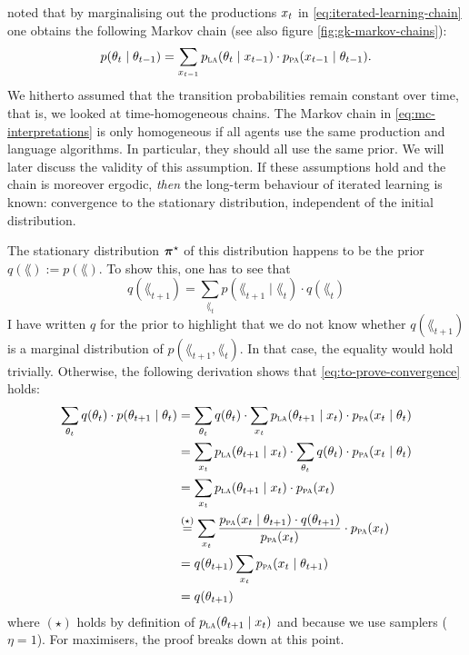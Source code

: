 \documentclass{../src/bcthesispart}
\begin{document}
\textcite{Griffiths2005} noted that by marginalising out the productions $x_t$ in \eqref{eq:iterated-learning-chain} one obtains the following Markov chain (see also figure \ref{fig:gk-markov-chains}):
\begin{align}
	p(\theta_t \mid \theta_{t-1}) 
		= \sum_{x_{t-1}} 
			p_{\textsc{la}}(\theta_t \mid x_{t-1}) 
			\cdot p_{\textsc{pa}}(x_{t-1} \mid \theta_{t-1}).
	\label{eq:mc-interpretations}
\end{align}
We hitherto assumed that the transition probabilities remain constant over time, that is, we looked at time-homogeneous chains. 
The Markov chain in \eqref{eq:mc-interpretations} is only homogeneous if all agents use the same production and language algorithms. 
In particular, they should all use the same prior.
We will later discuss the validity of this assumption. 
If these assumptions hold and the chain is moreover ergodic, \emph{then} the long-term behaviour of iterated learning is known: convergence to the stationary distribution, independent of the initial distribution.





The stationary distribution $\boldsymbol{\mathbf{\pi}}^\star$ of this distribution happens to be the prior $q(\lang) := p(\lang)$.
To show this, one has to see that
\begin{equation}
	\label{eq:to-prove-convergence}
	q( \lang_{t+1}) 
		= \sum_{\lang_t} 
			p(\lang_{t+1} \mid \lang_t) 
			\cdot q(\lang_t)
\end{equation}
I have written $q$ for the prior to highlight that we do not know whether $q(\lang_{t+1})$ is a marginal distribution of $p(\lang_{t+1}, \lang_t)$.
In that case, the equality would hold trivially.
Otherwise, the following derivation shows that \eqref{eq:to-prove-convergence} holds:
\begin{align}
	\label{eq:proof-conv-to-the-prior}
	\sum_{\lang_t} 
		q(\lang_t) 
		\cdot p(\lang_{t+1} \mid \lang_t)
		&= \sum_{\lang_t} 
				q(\lang_t) \cdot \sum_{\obs_t} 
					p_{\LA}(\lang_{t+1} \mid \obs_t)  
					\cdot p_{\PA}(\obs_t \mid \lang_t)
		\\
		&= \sum_{\obs_t} 
				p_{\LA}(\lang_{t+1} \mid \obs_t) 
				\cdot \sum_{\lang_t} 
		   			q(\lang_t) 
		   			\cdot p_{\PA}(\obs_t \mid \lang_t)
		\\\nonumber
		&= \sum_{\obs_t} 
			p_{\LA}(\lang_{t+1} \mid \obs_t) 
			\cdot p_{\PA}(\obs_t)
		\\\nonumber
		&\overset{(\star)}{=} 
			\sum_{\obs_t} 
				\frac{p_{\PA}(\obs_t \mid \lang_{t+1}) \cdot q(\lang_{t+1})}%
				{p_{\PA}(\obs_t)} \cdot p_{\PA}(\obs_t)
		\\\nonumber
		&= q(\lang_{t+1}) 
			\sum_{\obs_t} 
				p_{\PA}(\obs_t \mid \lang_{t+1})
		\\\nonumber
		&= q(\lang_{t+1}) 
\end{align}
where $(\star)$ holds by definition of $p_{\textsc{la}}(\theta_{t+1} \mid x_t)$ and because we use samplers ($\eta=1$).
For maximisers, the proof breaks down at this point.
\end{document}
